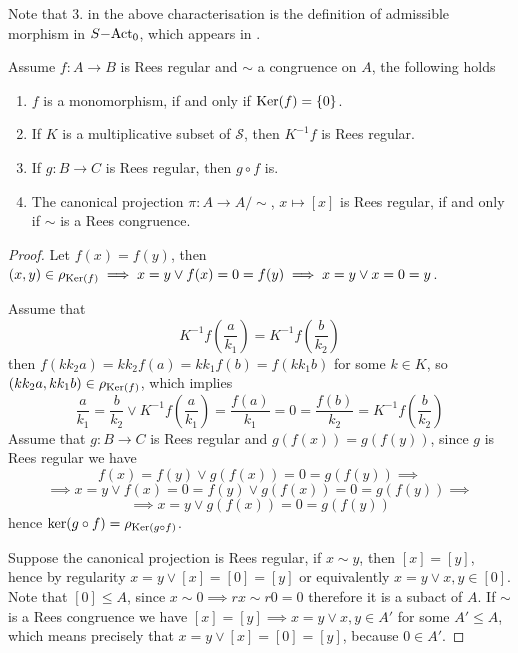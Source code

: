\begin{remark}
    Note that $3.$ in the above characterisation is the definition of admissible morphism in $S\mathrm{-Act}_0$, 
    which appears in \cite{Flores15}.
\end{remark}
\begin{proposition}
    Assume $f:A \to B$ is Rees regular and $\sim$ a congruence on $A$, the following holds
    \begin{enumerate}
        \item $f$ is a monomorphism, if and only if $\mathrm{Ker}(f) = \{0\}$.
        \item If $K$ is a multiplicative subset of $\mathcal{S}$, then $K^{-1}f$ is Rees regular.
        \item If $g: B \to C$ is Rees regular, then $g\circ f$ is.
        \item The canonical projection $\pi : A \to A/\sim$, $x\mapsto [x]$ is Rees regular, if and only if 
        $\sim$ is a Rees congruence.
    \end{enumerate}
\end{proposition}
\begin{proof}[Proof]
    Let $f(x)=f(y)$, then $(x,y)\in\rho_{\mathrm{Ker}(f)} \implies x=y \lor f(x)=0=f(y) \implies x=y \lor x=0=y$.\par 
    Assume that 
    \[
        K^{-1}f\left(\frac{a}{k_1}\right) = K^{-1}f\left(\frac{b}{k_2}\right)
    \]
    then $f(kk_2a)=kk_2f(a) = kk_1f(b)=f(kk_1b)$ for some $k\in K$, so $(kk_2 a,kk_1b)\in\rho_{\mathrm{Ker}(f)}$, which implies 
    \[
        \frac{a}{k_1}=\frac{b}{k_2} \lor K^{-1}f\left(\frac{a}{k_1}\right)= \frac{f(a)}{k_1} = 0 = \frac{f(b)}{k_2} = K^{-1}f\left(\frac{b}{k_2}\right) 
    \]
    Assume that $g: B\to C$ is Rees regular and $g(f(x))=g(f(y))$, since $g$ is Rees regular we have 
    \[
        f(x)=f(y) \lor g(f(x))=0=g(f(y)) \implies 
        \]
        \[\implies x=y \lor f(x)=0=f(y) \lor g(f(x))=0=g(f(y)) \implies
    \]
    \[
        \implies x=y \lor g(f(x))=0=g(f(y))
    \]
    hence $\mathrm{ker}(g\circ f) = \rho_{\mathrm{Ker}(g\circ f)}$.\par
    Suppose the canonical projection is Rees regular, if $x\sim y$, then $[x]=[y]$, hence by regularity 
    $x=y \lor [x]=[0]=[y]$ or equivalently $x=y\lor x,y\in [0]$. Note that $[0]\leq A$, since $x\sim 0 \implies rx\sim r0 = 0$ 
    therefore it is a subact of $A$. If $\sim$ is a Rees congruence we have $[x]=[y] \implies x=y \lor x,y\in A'$ for some $A'\leq A$,
    which means precisely that $x=y \lor [x]=[0]=[y]$, because $0\in A'$. 
\end{proof}
